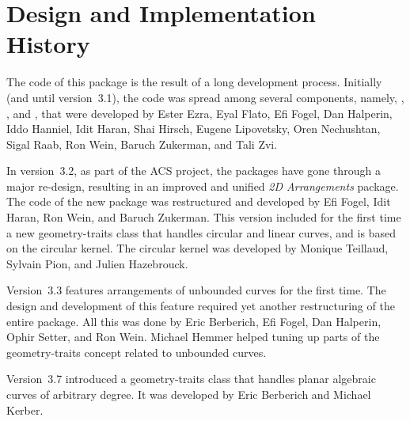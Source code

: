 \section*{Design and Implementation History}

The code of this package is the result of a long development process.
Initially (and until version~3.1), the code was spread among several
components, namely, , ,
 and , that were
developed by Ester Ezra, Eyal Flato, Efi Fogel, Dan Halperin, Iddo
Hanniel, Idit Haran, Shai Hirsch, Eugene Lipovetsky, Oren Nechushtan,
Sigal Raab, Ron Wein, Baruch Zukerman, and Tali Zvi.

In version~3.2, as part of the ACS project, the packages have gone
through a major re-design, resulting in an improved and unified
\emph{2D Arrangements} package.
The code of the new package was restructured and developed by
Efi Fogel, Idit Haran, Ron Wein, and Baruch Zukerman. This
version included for the first time a new geometry-traits
class that handles circular and linear curves, and is based
on the circular kernel. The circular kernel was developed
by Monique Teillaud, Sylvain Pion, and Julien Hazebrouck.

Version~3.3 features arrangements of unbounded curves for the first
time. The design and development of this feature required yet another
restructuring of the entire package. All this was done by Eric
Berberich, Efi Fogel, Dan Halperin, Ophir Setter, and Ron
Wein. Michael Hemmer helped tuning up parts of the geometry-traits 
concept related to unbounded curves.

Version~3.7 introduced a geometry-traits class
that handles planar algebraic curves of arbitrary degree.
It was developed by Eric Berberich and Michael Kerber.
